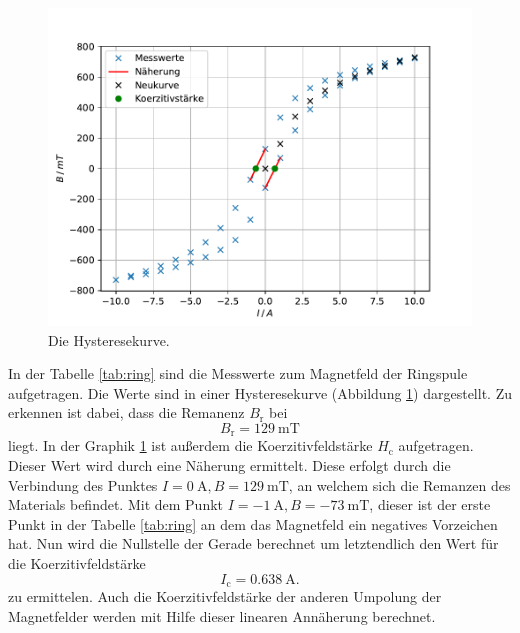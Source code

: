 \begin{figure}
\centering
\includegraphics[width=\textwidth]{content/data/plot_ring.pdf}
\caption{Die Hysteresekurve.}
\label{fig:ring}
\end{figure}

In der Tabelle \ref{tab:ring} sind die Messwerte zum Magnetfeld der Ringspule aufgetragen.
Die Werte sind in einer Hysteresekurve (Abbildung \ref{fig:ring}) dargestellt.
Zu erkennen ist dabei, dass die Remanenz $B_\text{r}$ bei 
\begin{equation*}
  B_\text{r} =\SI{129}{\milli\tesla}
\end{equation*}
liegt.
In der Graphik \ref{fig:ring} ist außerdem die Koerzitivfeldstärke $H_\text{c}$ aufgetragen.
Dieser Wert wird durch eine Näherung ermittelt.
Diese erfolgt durch die Verbindung des Punktes $I=\SI{0}{\ampere}, B=\SI{129}{\milli\tesla}$, an welchem sich die Remanzen des Materials befindet.
Mit dem Punkt $I=\SI{-1}{\ampere}, B=\SI{-73}{\milli\tesla}$, dieser ist der erste Punkt in der Tabelle \ref{tab:ring} an dem das Magnetfeld ein negatives Vorzeichen hat.
Nun wird die Nullstelle der Gerade berechnet um letztendlich den Wert für die Koerzitivfeldstärke
\begin{equation*}
  I_\text{c} =\SI{0.638}{\ampere}.
\end{equation*}
zu ermittelen.
Auch die Koerzitivfeldstärke der anderen Umpolung der Magnetfelder werden mit Hilfe dieser linearen Annäherung berechnet.